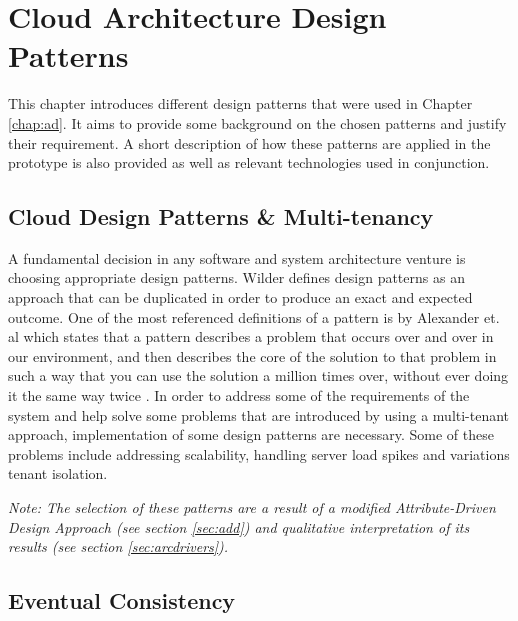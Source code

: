 \chapter{Cloud Architecture Design Patterns}
\label{chapter:patterns}
This chapter introduces different design patterns that were used in Chapter \ref{chap:ad}. It aims to provide some background on the chosen patterns and justify their requirement. A short description of how these patterns are applied in the prototype  is also provided as well as relevant technologies used in conjunction.

\section{Cloud Design Patterns \& Multi-tenancy}

A fundamental decision in any software and system architecture venture is choosing appropriate design patterns. Wilder \cite{Wilder2012-so} defines design patterns as an approach that can be duplicated in order to produce an exact and expected outcome. One of the most referenced definitions of a pattern is by Alexander et. al which states that a pattern describes a problem that occurs over and over in our environment, and then describes the core of the solution to that problem in such a way that you can use the solution a million times over, without ever doing it the same way twice \cite{Alexander1977-ni}. In order to address some of the requirements of the system and help solve some problems that are introduced by using a multi-tenant approach, implementation of some design patterns are necessary. Some of these problems include addressing scalability, handling server load spikes and variations tenant isolation. 

\textit{Note: The selection of these patterns are a result of a modified Attribute-Driven Design Approach (see section \ref{sec:add}) and qualitative interpretation of its results (see section \ref{sec:arcdrivers}).}

\section{Eventual Consistency}

